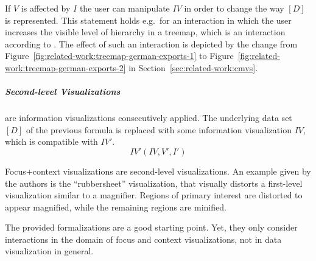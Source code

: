 If $V$ is affected by $I$ the user can manipulate $IV$ in order to change the way $[D]$ is represented.
This statement holds e.g.\ for an interaction in which the user increases the visible level of hierarchy in a treemap, which is an  interaction according to \textcite{Yi2007}.
The effect of such an interaction is depicted by the change from Figure~\ref{fig:related-work:treemap-german-exports-1} to Figure~\ref{fig:related-work:treemap-german-exports-2} in Section~\ref{sec:related-work:cmvs}.

\subparagraph{Second-level Visualizations} are information visualizations consecutively applied.
The underlying data set $[D]$ of the previous formula is replaced with some information visualization $IV$, which is compatible with $IV'$.
\begin{equation}
  IV'(IV, V', I')
\end{equation}

Focus+context visualizations are second-level visualizations.
An example given by the authors is the  ``rubbersheet'' visualization, that visually distorts a first-level visualization similar to a magnifier.
Regions of primary interest are distorted to appear magnified, while the remaining regions are minified.

The provided formalizations are a good starting point.
Yet, they only consider interactions in the domain of focus and context visualizations, not in data visualization in general.


